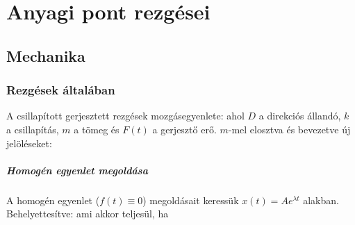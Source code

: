  \chapter{Anyagi pont rezg\'esei}
 
 \section{Mechanika} 
  
  \subsection{Rezgések általában}
   
   A csillapított gerjesztett rezgések mozgásegyenlete:
   ahol $D$ a direkciós állandó, $k$ a csillapítás, $m$ a tömeg és $F(t)$ a gerjesztő erő. $m$-mel elosztva és bevezetve új jelöléseket:
   \paragraph{Homogén egyenlet megoldása}
    
    A homogén egyenlet ($f(t)\equiv 0$) megoldásait keressük $x(t)=Ae^{\lambda t}$ alakban. Behelyettesítve:
    ami akkor teljesül, ha 
    
